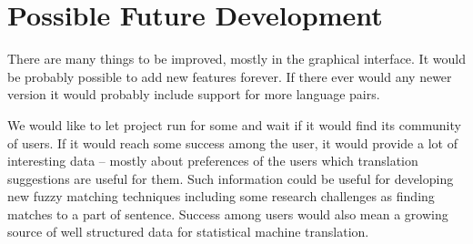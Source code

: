 \section{Possible Future Development}

There are many things to be improved, mostly in the graphical interface. It would be probably possible to add new features forever. If there ever would any newer version it would probably include support for more language pairs.

We would like to let project run for some and wait if it would find its community of users. If it would reach some success among the user, it would provide a lot of interesting data -- mostly about preferences of the users which translation suggestions are useful for them. Such information could be useful for developing new fuzzy matching techniques including some research challenges as finding matches to a part of sentence. Success among users would also mean a growing source of well structured data for statistical machine translation.